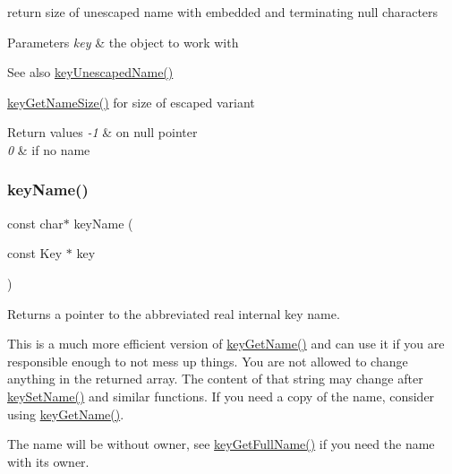 return size of unescaped name with embedded and terminating null characters 


\begin{DoxyParams}{Parameters}
{\em key} & the object to work with\\
\hline
\end{DoxyParams}
\begin{DoxySeeAlso}{See also}
\hyperlink{group__keyname_ga6fe6af4c27b35d911a533f4ae4d698bb}{key\+Unescaped\+Name()} 

\hyperlink{group__keyname_gabdbcfa51ed8a387e47ead207affa2d2e}{key\+Get\+Name\+Size()} for size of escaped variant 
\end{DoxySeeAlso}

\begin{DoxyRetVals}{Return values}
{\em -\/1} & on null pointer \\
\hline
{\em 0} & if no name \\
\hline
\end{DoxyRetVals}
\mbox{\label{group__keyname_ga8e805c726a60da921d3736cda7813513}} 
\subsubsection{\texorpdfstring{key\+Name()}{keyName()}}
{\footnotesize\ttfamily const char$\ast$ key\+Name (\begin{DoxyParamCaption}\item[{const Key $\ast$}]{key }\end{DoxyParamCaption})}



Returns a pointer to the abbreviated real internal {\ttfamily key} name. 

This is a much more efficient version of \hyperlink{group__keyname_gab29a850168d9b31c9529e90cf9ab68be}{key\+Get\+Name()} and can use it if you are responsible enough to not mess up things. You are not allowed to change anything in the returned array. The content of that string may change after \hyperlink{group__keyname_ga7699091610e7f3f43d2949514a4b35d9}{key\+Set\+Name()} and similar functions. If you need a copy of the name, consider using \hyperlink{group__keyname_gab29a850168d9b31c9529e90cf9ab68be}{key\+Get\+Name()}.

The name will be without owner, see \hyperlink{group__keyname_gaaba1494a5ffc976e0e56c43f4334a23c}{key\+Get\+Full\+Name()} if you need the name with its owner.


